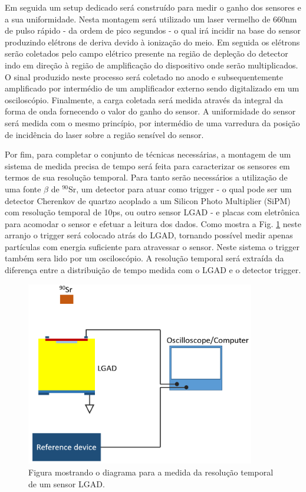 Em seguida um setup dedicado será construído para medir o ganho dos sensores e a sua uniformidade. Nesta montagem será utilizado um laser vermelho de 660nm de pulso rápido - da ordem de pico segundos - o qual irá incidir na base do sensor produzindo elétrons de deriva devido à ionização do meio. Em seguida os elétrons serão coletados pelo campo elétrico presente na região de depleção do detector indo em direção à região de amplificação do dispositivo onde serão multiplicados. O sinal produzido neste processo será coletado no anodo e subsequentemente amplificado por intermédio de um amplificador externo sendo digitalizado em um osciloscópio. Finalmente, a carga coletada será medida através da integral da forma de onda fornecendo o valor do ganho do sensor. A uniformidade do sensor será medida com o mesmo princípio, por intermédio de uma varredura da posição de incidência do laser sobre a região sensível do sensor.

Por fim, para completar o conjunto de técnicas necessárias, a montagem de um sistema de medida precisa de tempo será feita para caracterizar os sensores em termos de sua resolução temporal. Para tanto serão necessários a utilização de uma fonte $\beta$ de $^{90}$Sr, um detector para atuar como trigger - o qual pode ser um detector Cherenkov de quartzo acoplado a um Silicon Photo Multiplier (SiPM) com resolução temporal de 10ps, ou outro sensor LGAD - e placas com eletrônica para acomodar o sensor e efetuar a leitura dos dados. Como mostra a Fig. \ref{setup2} neste arranjo o trigger será colocado atrás do LGAD, tornando possível medir apenas partículas com energia suficiente para atravessar o sensor. Neste sistema o trigger também sera lido por um osciloscópio. A resolução temporal será extraída da diferença entre a distribuição de tempo medida com o LGAD e o detector trigger.

\begin{figure}
    \centering
    \includegraphics[width=10.0cm]{assets/time.png}
    \caption{Figura mostrando o diagrama para a medida da resolução temporal de um sensor LGAD.}
    \label{setup2}
\end{figure}

